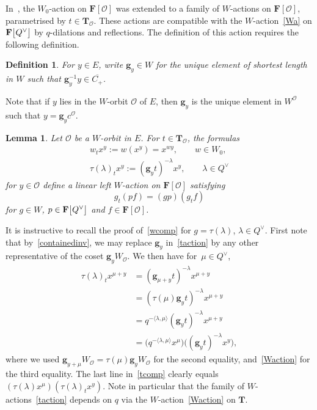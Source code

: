\documentclass[pdftex]{sigma}
\numberwithin{equation}{section}
\newtheorem{Lemma}[Theorem]{Lemma}
\newtheorem{Definition}[Theorem]{Definition}
\begin{document}
In~\cite[Lemma 4.2]{SSV2}, the $W_0$-action on $\mathbf{F}[\mathcal{O}]$ was extended to a family of $W$-actions on $\mathbf{F}[\mathcal{O}]$, parametrised by
$t\in\mathbf{T}_\mathcal{O}$. These actions are compatible with the $W$-action~\eqref{Wa} on $\mathbf{F}\smash{\bigl[Q^\vee\bigr]}$ by $q$-dilations and reflections.
The definition of this action requires the following definition.

\begin{Definition}\label{gy}
For $y\in E$, write $\mathbf{g}_y\in W$ for the unique element of shortest length in $W$ such that $\mathbf{g}_y^{-1}y\in\overline{C_+}$.
\end{Definition}
Note that if $y$ lies in the $W$-orbit $\mathcal{O}$ of $E$,
then $\mathbf{g}_y$ is the unique element in $W^\mathcal{O}$ such that
$y=\mathbf{g}_yc^\mathcal{O}$.
\begin{Lemma}\label{tdefaction}
Let $\mathcal{O}$ be a $W$-orbit in $E$. For $t\in\mathbf{T}_\mathcal{O}$,
 the formulas
\begin{gather}
w_tx^y:=w(x^y)=x^{wy},\qquad w\in W_0, \nonumber\\
\tau(\lambda)_tx^y:=(\mathbf{g}_yt)^{-\lambda}x^y,\qquad \lambda\in Q^\vee\label{taction}
\end{gather}
for $y\in\mathcal{O}$ define a linear left $W$-action on $\mathbf{F}[\mathcal{O}]$
 satisfying
\begin{equation}\label{wcomp}
g_t(pf)=(gp)(g_tf)
\end{equation}
for $g\in W$, $p\in\mathbf{F}\smash{\bigl[Q^\vee\bigr]}$ and $f\in\mathbf{F}[\mathcal{O}]$.
\end{Lemma}
It is instructive to recall the proof of~\eqref{wcomp} for $g=\tau(\lambda)$, $\lambda\in Q^\vee$. First note that by~\eqref{containedinv},
we may replace $\mathbf{g}_y$ in~\eqref{taction} by any other representative of the coset $\mathbf{g}_yW_\mathcal{O}$.
We then have for~${\mu\in Q^\vee}$,
\begin{align}
\tau(\lambda)_tx^{\mu+y}&=(\mathbf{g}_{\mu+y}t)^{-\lambda}x^{\mu+y} \nonumber\\
&=(\tau(\mu)\mathbf{g}_yt)^{-\lambda}x^{\mu+y} \nonumber\\
&=q^{-\langle\lambda,\mu\rangle}(\mathbf{g}_y t)^{-\lambda}x^{\mu+y} \nonumber\\
&=\bigl(q^{-\langle\lambda,\mu\rangle}x^\mu\bigr)\bigl((\mathbf{g}_yt)^{-\lambda}x^y\bigr),\label{tcomp}
\end{align}
where we used $\mathbf{g}_{y+\mu}W_\mathcal{O}=\tau(\mu)\mathbf{g}_yW_\mathcal{O}$ for the second equality, and~\eqref{Waction} for the third equality.
The last line in~\eqref{tcomp} clearly equals $(\tau(\lambda)x^\mu)(\tau(\lambda)_tx^y)$. Note in particular that the family of $W$-actions~\eqref{taction} depends on $q$ via the $W$-action~\eqref{Waction} on $\mathbf{T}$.
\end{document}

